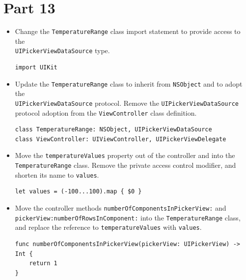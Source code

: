 \documentclass[a4paper,11pt]{scrartcl}
\begin{document}
\section*{Part 13}

\begin{itemize}
\item Change the \texttt{TemperatureRange} class import statement to provide access to the \\\texttt{UIPickerViewDataSource} type.
\begin{lstlisting}
import UIKit
\end{lstlisting}
\item Update the \texttt{TemperatureRange} class to inherit from \texttt{NSObject} and to adopt the \\\texttt{UIPickerViewDataSource} protocol. Remove the \texttt{UIPickerViewDataSource} protocol adoption from the \texttt{ViewController} class definition.
\begin{lstlisting}
class TemperatureRange: NSObject, UIPickerViewDataSource
class ViewController: UIViewController, UIPickerViewDelegate
\end{lstlisting}
\item Move the \texttt{temperatureValues} property out of the controller and into the \texttt{TemperatureRange} class. Remove the private access control modifier, and shorten its name to \texttt{values}.
\begin{lstlisting}
let values = (-100...100).map { $0 }
\end{lstlisting}
\item Move the controller methods \texttt{numberOfComponentsInPickerView:} and \\\texttt{pickerView:numberOfRowsInComponent:} into the \texttt{TemperatureRange} class, and replace the reference to \texttt{temperatureValues} with \texttt{values}.
\begin{lstlisting}
func numberOfComponentsInPickerView(pickerView: UIPickerView) -> Int {
	return 1
}


\end{lstlisting}
\end{itemize}
\end{document}
